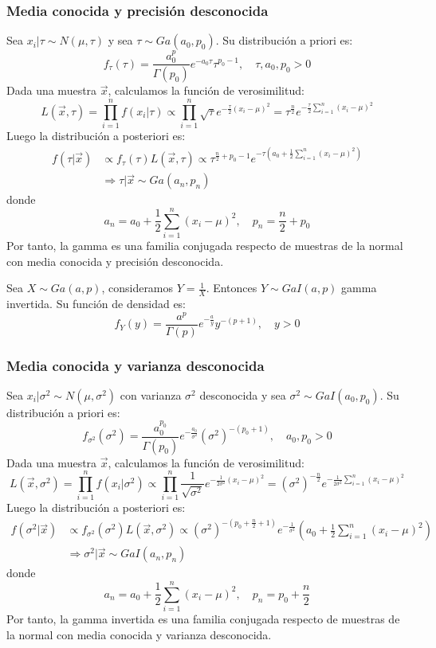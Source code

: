 \subsubsection*{Media conocida y precisión desconocida}
Sea $x_i|\tau \sim N(\mu, \tau)$ y sea $\tau \sim Ga(a_0, p_0)$.
Su distribución a priori es:
$$f_\tau(\tau) = \frac{a_0^p}{\Gamma(p_0)}e^{-a_0\tau}\tau^{p_0-1}, \quad \tau, a_0, p_0 > 0$$
Dada una muestra $\vec{x}$, calculamos la función de verosimilitud:
$$L(\vec{x}, \tau) = \prod_{i=1}^n f(x_i|\tau) \propto \prod_{i=1}^n \sqrt{\tau}e^{-\frac{\tau}{2}(x_i-\mu)^2} = \tau^{\frac{n}{2}}e^{-\frac{\tau}{2}\sum_{i=1}^n(x_i-\mu)^2}$$
Luego la distribución a posteriori es:
\begin{align*}
    f(\tau|\vec{x}) & \propto f_\tau(\tau)L(\vec{x}, \tau) \propto \tau^{\frac{n}{2}+p_0-1}e^{-\tau\left(a_0+\frac{1}{2}\sum_{i=1}^n(x_i-\mu)^2\right)} \\
                    & \Rightarrow \tau|\vec{x} \sim Ga(a_n, p_n)
\end{align*}
donde
$$a_n = a_0 + \frac{1}{2}\sum_{i=1}^n(x_i-\mu)^2, \quad p_n = \frac{n}{2}+p_0$$
Por tanto, la gamma es una familia conjugada respecto de muestras de la normal con media conocida y precisión desconocida.

\begin{definition}
    Sea $X \sim Ga(a, p)$, consideramos $Y = \frac{1}{X}$.
    Entonces $Y \sim GaI(a, p)$ gamma invertida.
    Su función de densidad es:
    $$f_Y(y) = \frac{a^p}{\Gamma(p)} e^{-\frac{a}{y}} y^{-(p+1)}, \quad y > 0$$
\end{definition}

\subsubsection*{Media conocida y varianza desconocida}
Sea $x_i|\sigma^2 \sim N(\mu, \sigma^2)$ con varianza $\sigma^2$ desconocida y sea $\sigma^2 \sim GaI(a_0, p_0)$.
Su distribución a priori es:
$$f_{\sigma^2}(\sigma^2) = \frac{a_0^{p_0}}{\Gamma(p_0)}e^{-\frac{a_0}{\sigma^2}}(\sigma^2)^{-(p_0+1)}, \quad a_0, p_0 > 0$$
Dada una muestra $\vec{x}$, calculamos la función de verosimilitud:
$$L(\vec{x}, \sigma^2) = \prod_{i=1}^n f(x_i|\sigma^2) \propto \prod_{i=1}^n \frac{1}{\sqrt{\sigma^2}}e^{-\frac{1}{2\sigma^2}(x_i-\mu)^2} = (\sigma^2)^{-\frac{n}{2}}e^{-\frac{1}{2\sigma^2}\sum_{i=1}^n(x_i-\mu)^2}$$
Luego la distribución a posteriori es:
\begin{align*}
    f(\sigma^2|\vec{x}) & \propto f_{\sigma^2}(\sigma^2)L(\vec{x}, \sigma^2) \propto (\sigma^2)^{-\left(p_0+\frac{n}{2}+1\right)}e^{-\frac{1}{\sigma^2}}\left(a_0+\frac{1}{2}\sum_{i=1}^n(x_i-\mu)^2\right) \\
                        & \Rightarrow \sigma^2|\vec{x} \sim GaI(a_n, p_n)
\end{align*}
donde
$$a_n = a_0 + \frac{1}{2}\sum_{i=1}^n(x_i-\mu)^2, \quad p_n = p_0 + \frac{n}{2}$$
Por tanto, la gamma invertida es una familia conjugada respecto de muestras de la normal con media conocida y varianza desconocida.

